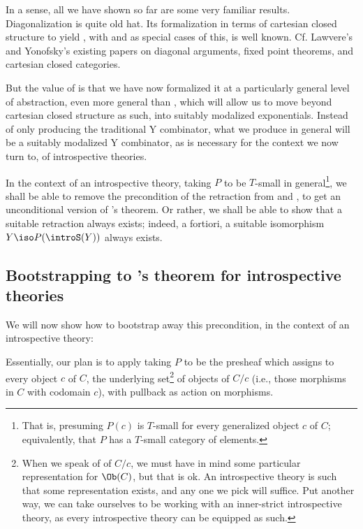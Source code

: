 In a sense, all we have shown so far are some very familiar results. Diagonalization is quite old hat. Its formalization in terms of cartesian closed structure to yield , with  and  as special cases of this, is well known. Cf. Lawvere's and Yonofsky's existing papers on diagonal arguments, fixed point theorems, and cartesian closed categories. 

But the value of  is that we have now formalized it at a particularly general level of abstraction, even more general than , which will allow us to move beyond cartesian closed structure as such, into suitably modalized exponentials. Instead of only producing the traditional Y combinator, what we produce in general will be a suitably modalized Y combinator, as is necessary for the context we now turn to, of introspective theories.

In the context of an introspective theory, taking $P$ to be $T$-small in general\footnote{That is, presuming $P(c)$ is $T$-small for every generalized object $c$ of $C$; equivalently, that $P$ has a $T$-small category of elements.}, we shall be able to remove the precondition of the retraction from  and , to get an unconditional version of \Loeb's theorem. Or rather, we shall be able to show that a suitable retraction always exists; indeed, a fortiori, a suitable isomorphism $Y \iso P(\introS(Y))$ always exists.

\subsection{Bootstrapping to \Loeb's theorem for introspective theories}
We will now show how to bootstrap away this precondition, in the context of an introspective theory:

Essentially, our plan is to apply  taking $P$ to be the presheaf which assigns to every object $c$ of $C$, the underlying set\footnote{When we speak of  of $C/c$, we must have in mind some particular representation for $\Ob(C)$, but that is ok. An introspective theory is such that some representation exists, and any one we pick will suffice. Put another way, we can take ourselves to be working with an inner-strict introspective theory, as every introspective theory can be equipped as such.} of objects of $C/c$ (i.e., those morphisms in $C$ with codomain $c$), with pullback as action on morphisms.


